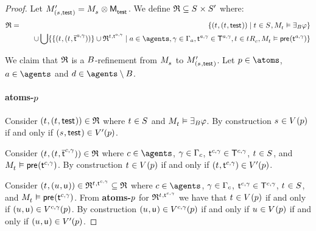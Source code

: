 \begin{proof}
Let $\kPModelP{(\kStateS, \aStateTest)} = \kPModel{\kStateS} \exec \aPModel{\aStateTest}$.
We define $\refinement \subseteq \kStates \times \kStatesP$ where:
\begin{eqnarray*}
\refinement &=& 
    \{(\kStateT, (\kStateT, \aStateTest)) \mid \kStateT \in \kStates, \kPModel{\kStateT} \entails \someactsBs \phi \} \\&&\quad \cup 
\bigcup \{\{(\kStateT, (\kStateT, \aPStateT[\agentA, \gamma]))\} \cup \refinement^{\kStateT, \aStateT[\agentA, \gamma]} \mid \agentA \in \agents, \gamma \in \Gamma_\agentA, \aStateT[\agentA, \gamma] \in \aStatesT[\agentA, \gamma], \kStateT \in \kSuccessorsC{\kStateT}, \kPModel{\kStateT} \entails \aPrecondition(\aStateT[\agentA, \gamma])\}
\end{eqnarray*}

We claim that $\refinement$ is a $\agentsB$-refinement from $\kPModel{\kStateS}$ to $\kPModelP{(\kStateS, \aStateTest)}$.
Let $\atomP \in \atoms$, $\agentA \in \agents$ and $\agentD \in \agents \setminus \agentsB$.

\paragraph{atoms-$\atomP$}
Consider $(\kStateT, (\kStateT, \aStateTest)) \in \refinement$ where $\kStateT \in \kStates$ and $\kPModel{\kStateT} \entails \someactsBs \phi$.
By construction $\kStateS \in \kValuation(\atomP)$ if and only if $(\kStateS, \aStateTest) \in \kValuationP(\atomP)$.

Consider $(\kStateT, (\kStateT, \aPStateT[\agentC, \gamma])) \in \refinement$ where $\agentC \in \agents$, $\gamma \in \Gamma_\agentC$, $\aStateT[\agentC, \gamma] \in \aStatesT[\agentC, \gamma]$, $\kStateT \in \kStates$, and $\kPModel{\kStateT} \entails \aPrecondition(\aStateT[\agentC, \gamma])$.
By construction $\kStateT \in \kValuation(\atomP)$ if and only if $(\kStateT, \aStateT[\agentC, \gamma]) \in \kValuationP(\atomP)$.

Consider $(\kStateT, (\kStateU, \aStateU)) \in \refinement^{\kStateT, \aStateT[\agentC, \gamma]} \subseteq \refinement$ where $\agentC \in \agents$, $\gamma \in \Gamma_\agentC$, $\aStateT[\agentC, \gamma] \in \aStatesT[\agentC, \gamma]$, $\kStateT \in \kStates$, and $\kPModel{\kStateT} \entails \aPrecondition(\aStateT[\agentC, \gamma])$.
From {\bf atoms-$\atomP$} for $\refinement^{\kStateT, \aStateT[\agentC, \gamma]}$ we have that $\kStateT \in \kValuation(\atomP)$ if and only if $(\kStateU, \aStateU) \in \kValuation[\agentC, \gamma](\atomP)$.
By construction $(\kStateU, \aStateU) \in \kValuation[\agentC, \gamma](\atomP)$ if and only if $\kStateU \in \kValuation(\atomP)$ if and only if $(\kStateU, \aStateU) \in \kValuationP(\atomP)$.


\end{proof}

